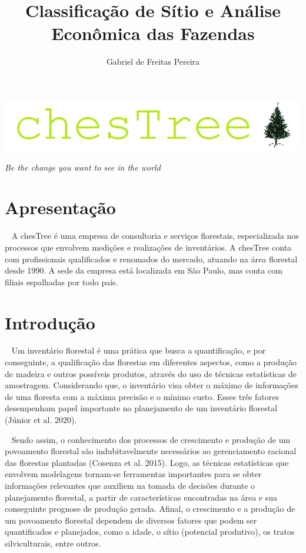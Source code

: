 \documentclass[
  letterpaper,
  DIV=11,
  numbers=noendperiod]{scrartcl}
\title{Classificação de Sítio e Análise Econômica das Fazendas}
\author{Gabriel de Freitas Pereira}
\date{}
\renewcommand*\contentsname{Índice}
\newcommand\contentsname{Índice}
\begin{document}
\maketitle
\ifdefined\Shaded\renewenvironment{Shaded}{\begin{tcolorbox}[frame hidden, borderline west={3pt}{0pt}{shadecolor}, enhanced, interior hidden, boxrule=0pt, sharp corners, breakable]}{\end{tcolorbox}}\fi

\renewcommand*\contentsname{Índice}
{
\hypersetup{linkcolor=}
\setcounter{tocdepth}{3}
\tableofcontents
}
\includegraphics{chestreelogo.png}

\emph{Be the change you want to see in the world}

\newpage

\hypertarget{apresentauxe7uxe3o}{%
\section{Apresentação}\label{apresentauxe7uxe3o}}

~ A chesTree é uma empresa de consultoria e serviços florestais,
especializada nos processos que envolvem medições e realizações de
inventários. A chesTree conta com profissionais qualificados e renomados
do mercado, atuando na área florestal desde 1990. A sede da empresa está
localizada em São Paulo, mas conta com filiais espalhadas por todo país.

\hypertarget{introduuxe7uxe3o}{%
\section{Introdução}\label{introduuxe7uxe3o}}

~ Um inventário florestal é uma prática que busca a quantificação, e por
conseguinte, a qualificação das florestas em diferentes aspectos, como a
produção de madeira e outros possíveis produtos, através do uso de
técnicas estatísticas de amostragem. Considerando que, o inventário visa
obter o máximo de informações de uma floresta com a máxima precisão e o
mínimo custo. Esses três fatores desempenham papel importante no
planejamento de um inventário florestal (Júnior et al. 2020).

~ Sendo assim, o conhecimento dos processos de crescimento e produção de
um povoamento florestal são indubitavelmente necessários ao
gerenciamento racional das florestas plantadas (Cosenza et al. 2015).
Logo, as técnicas estatísticas que envolvem modelagens tornam-se
ferramentas importantes para se obter informações relevantes que
auxiliem na tomada de decisões durante o planejamento florestal, a
partir de características encontradas na área e sua conseguinte prognose
de produção gerada. Afinal, o crescimento e a produção de um povoamento
florestal dependem de diversos fatores que podem ser quantificados e
planejados, como a idade, o sítio (potencial produtivo), os tratos
silviculturais, entre outros.
\end{document}
